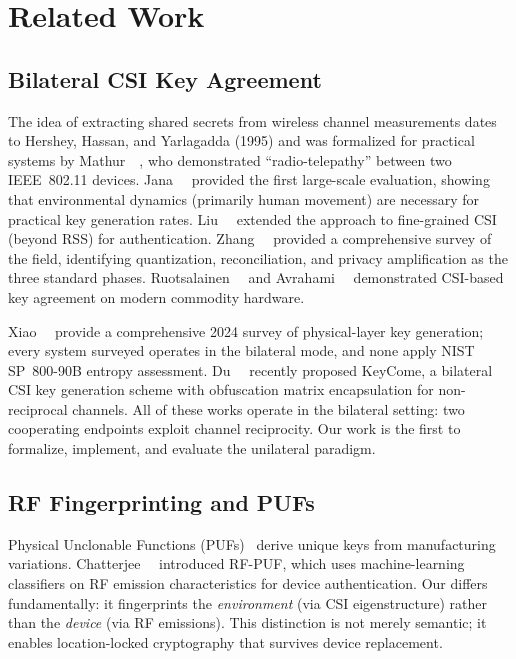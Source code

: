 \section{Related Work}
\label{sec:related}

\subsection{Bilateral CSI Key Agreement}
\label{subsec:related-bilateral}

The idea of extracting shared secrets from wireless channel measurements dates to Hershey, Hassan, and Yarlagadda (1995) and was formalized for practical systems by Mathur~\etal~\cite{mathur2008radio}, who demonstrated ``radio-telepathy'' between two IEEE~802.11 devices.
Jana~\etal~\cite{jana2009effectiveness} provided the first large-scale evaluation, showing that environmental dynamics (primarily human movement) are necessary for practical key generation rates.
Liu~\etal~\cite{liu2012exploiting} extended the approach to fine-grained CSI (beyond RSS) for authentication.
Zhang~\etal~\cite{zhang2016csikey} provided a comprehensive survey of the field, identifying quantization, reconciliation, and privacy amplification as the three standard phases.
Ruotsalainen~\etal~\cite{ruotsalainen2023shake} and Avrahami~\etal~\cite{avrahami2023csi} demonstrated CSI-based key agreement on modern commodity hardware.

Xiao~\etal~\cite{xiao2024securing} provide a comprehensive 2024 survey of physical-layer key generation; every system surveyed operates in the bilateral mode, and none apply NIST SP~800-90B entropy assessment.
Du~\etal~\cite{du2024keycome} recently proposed KeyCome, a bilateral CSI key generation scheme with obfuscation matrix encapsulation for non-reciprocal channels.
All of these works operate in the bilateral setting: two cooperating endpoints exploit channel reciprocity.
Our work is the first to formalize, implement, and evaluate the unilateral paradigm.

\subsection{RF Fingerprinting and PUFs}
\label{subsec:related-puf}

Physical Unclonable Functions (PUFs)~\cite{suh2007puf} derive unique keys from manufacturing variations.
Chatterjee~\etal~\cite{chatterjee2019rfpuf} introduced RF-PUF, which uses machine-learning classifiers on RF emission characteristics for device authentication.
Our \puek differs fundamentally: it fingerprints the \emph{environment} (via CSI eigenstructure) rather than the \emph{device} (via RF emissions).
This distinction is not merely semantic; it enables location-locked cryptography that survives device replacement.

